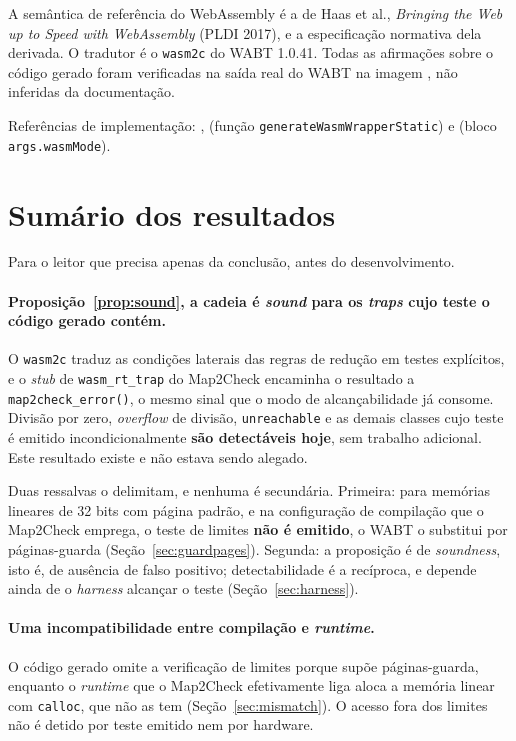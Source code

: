 \documentclass[11pt,a4paper]{article}
\theoremstyle{definition}
\newcommand{\code}[1]{\texttt{#1}}
\begin{document}
A semântica de referência do WebAssembly é a de Haas et al., \emph{Bringing the
Web up to Speed with WebAssembly} (PLDI 2017), e a especificação normativa dela
derivada. O tradutor é o \code{wasm2c} do WABT 1.0.41. Todas as afirmações sobre
o código gerado foram verificadas na saída real do WABT na imagem
, não inferidas da documentação.

Referências de implementação: ,
 (função \code{generateWasmWrapperStatic}) e
 (bloco \code{args.wasmMode}).

\section{Sumário dos resultados}

Para o leitor que precisa apenas da conclusão, antes do desenvolvimento.

\paragraph{Proposição~\ref{prop:sound}, a cadeia é \emph{sound} para os
\emph{traps} cujo teste o código gerado contém.}
O \code{wasm2c} traduz as condições laterais das regras de redução em testes
explícitos, e o \emph{stub} de \code{wasm\_rt\_trap} do Map2Check encaminha o
resultado a \code{map2check\_error()}, o mesmo sinal que o modo de
alcançabilidade já consome. Divisão por zero, \emph{overflow} de divisão,
\code{unreachable} e as demais classes cujo teste é emitido incondicionalmente
\textbf{são detectáveis hoje}, sem trabalho adicional. Este resultado existe e
não estava sendo alegado.

Duas ressalvas o delimitam, e nenhuma é secundária. Primeira: para memórias
lineares de 32 bits com página padrão, e na configuração de compilação que o
Map2Check emprega, o teste de limites \textbf{não é emitido},
o WABT o substitui por páginas-guarda (Seção~\ref{sec:guardpages}). Segunda: a
proposição é de \emph{soundness}, isto é, de ausência de falso positivo;
detectabilidade é a recíproca, e depende ainda de o \emph{harness} alcançar o
teste (Seção~\ref{sec:harness}).

\paragraph{Uma incompatibilidade entre compilação e \emph{runtime}.}
O código gerado omite a verificação de limites porque supõe páginas-guarda,
enquanto o \emph{runtime} que o Map2Check efetivamente liga aloca a memória
linear com \code{calloc}, que não as tem (Seção~\ref{sec:mismatch}). O acesso fora
dos limites não é detido por teste emitido nem por hardware.
\end{document}
